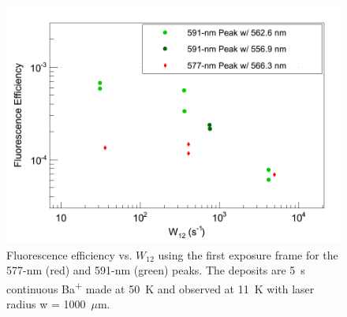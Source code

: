 \begin{figure} %
        \centering
                \includegraphics[width=.7\textwidth]{figures/QE_just1000_separteSigmas.png}
                \caption{Fluorescence efficiency vs. $W_{12}$ using the first exposure frame for the 577-nm (red) and 591-nm (green) peaks.  The deposits are 5~s continuous Ba\textsuperscript{+} made at 50~K and observed at 11~K with laser radius w = 1000~$\mu$m.}
\label{fig:qe}
\end{figure}





